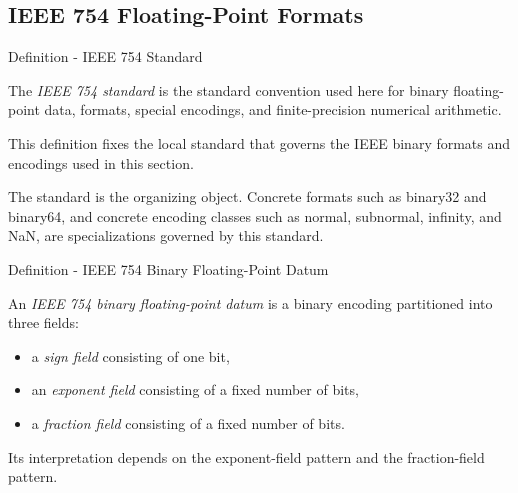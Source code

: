 
\subsection*{IEEE 754 Floating-Point Formats}




\begin{definitionbox}{Definition - IEEE 754 Standard}
\begin{definition}
\label{def:numerical-analysis-ieee-754-standard}
The \emph{IEEE 754 standard} is the standard convention used here for binary
floating-point data, formats, special encodings, and finite-precision numerical
arithmetic.
\end{definition}

\DefinitionalRoot
\end{definitionbox}

\begin{remark*}
This definition fixes the local standard that governs the IEEE binary formats
and encodings used in this section.
\end{remark*}

\begin{remark*}[Interpretation]
The standard is the organizing object. Concrete formats such as binary32 and
binary64, and concrete encoding classes such as normal, subnormal, infinity,
and NaN, are specializations governed by this standard.
\end{remark*}

\begin{definitionbox}{Definition - IEEE 754 Binary Floating-Point Datum}
\begin{definition}
\label{def:numerical-analysis-ieee-754-binary-floating-point-datum}
An \emph{IEEE 754 binary floating-point datum} is a binary encoding partitioned into
three fields:

\begin{itemize}
    \item a \emph{sign field} consisting of one bit,
    \item an \emph{exponent field} consisting of a fixed number of bits,
    \item a \emph{fraction field} consisting of a fixed number of bits.
\end{itemize}

Its interpretation depends on the exponent-field pattern and the fraction-field pattern.
\end{definition}
\end{definitionbox}

